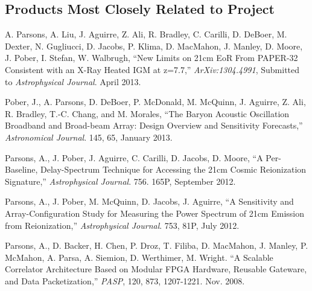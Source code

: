 \documentclass[apjpt4]{aastex}
\begin{document}
\subsection*{Products Most Closely Related to Project}
\vspace{-8pt}

%

{ A. Parsons}, A. Liu, J. Aguirre, Z. Ali, R. Bradley, C. Carilli, D. DeBoer, M. Dexter, N. Gugliucci, D. Jacobs, P. Klima, D. MacMahon, J. Manley, D. Moore, J. Pober, I. Stefan, W. Walbrugh,
``New Limits on 21cm EoR From PAPER-32 Consistent with an X-Ray Heated IGM at z=7.7,''
{\it ArXiv:1304.4991}, Submitted to {\it Astrophysical Journal}. April 2013.

Pober, J., { A. Parsons}, D. DeBoer, P. McDonald, M. McQuinn,
  J. Aguirre, Z. Ali, R.  Bradley, T.-C. Chang, and M. Morales,
``The Baryon Acoustic Oscillation Broadband and
  Broad-beam Array: Design Overview and Sensitivity Forecasts,''
{\it Astronomical Journal}. 145, 65, January 2013.

Parsons, A., J. Pober, J. Aguirre, C. Carilli, D. Jacobs, D. Moore,
``A Per-Baseline, Delay-Spectrum Technique for Accessing the 21cm Cosmic Reionization Signature,''
{\it Astrophysical Journal}. 756. 165P, September 2012.

Parsons, A., J. Pober, M. McQuinn, D. Jacobs, J. Aguirre,
``A Sensitivity and Array-Configuration Study for Measuring the Power Spectrum of 21cm Emission from Reionization,''
{\it Astrophysical Journal}. 753, 81P, July 2012.

Parsons, A., D. Backer, H. Chen, P. Droz, T. Filiba, D. MacMahon, J. Manley,
P. McMahon, A. Parsa, A. Siemion, D. Werthimer, M. Wright.
``A Scalable Correlator Architecture Based on Modular FPGA Hardware,
Reusable Gateware, and Data Packetization,''
{\it PASP}, 120, 873, 1207-1221. Nov. 2008.
\end{document}
